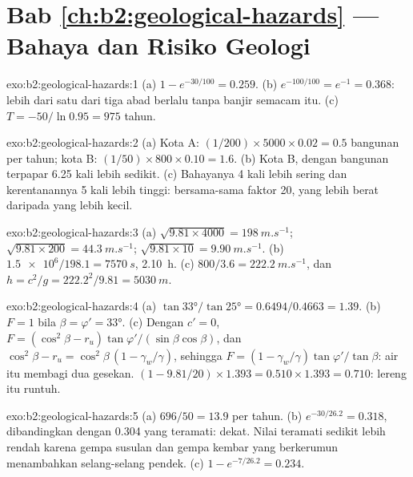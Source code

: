 \section*{Bab \ref{ch:b2:geological-hazards} --- Bahaya dan Risiko Geologi}

\begin{solution}{exo:b2:geological-hazards:1}
(a) $1 - e^{-30/100} = 0.259$. (b) $e^{-100/100} = e^{-1} = 0.368$: lebih dari satu dari tiga abad
berlalu tanpa banjir semacam itu. (c) $T = -50/\ln 0.95 = 975$ tahun.
\end{solution}

\begin{solution}{exo:b2:geological-hazards:2}
(a) Kota A: $(1/200) \times 5000 \times 0.02 = 0.5$ bangunan per tahun; kota B: $(1/50) \times 800
\times 0.10 = 1.6$. (b) Kota B, dengan bangunan terpapar 6.25 kali lebih sedikit. (c) Bahayanya 4 kali
lebih sering dan kerentanannya 5 kali lebih tinggi: bersama-sama faktor 20, yang lebih berat daripada
 yang lebih kecil.
\end{solution}

\begin{solution}{exo:b2:geological-hazards:3}
(a) $\sqrt{9.81 \times 4000} = \qty{198}{m.s^{-1}}$; $\sqrt{9.81 \times 200} = \qty{44.3}{m.s^{-1}}$;
$\sqrt{9.81 \times 10} = \qty{9.90}{m.s^{-1}}$. (b) $\num{1.5e6}/198.1 = \qty{7570}{s}$, \qty{2.10}{h}.
(c) $800/3.6 = \qty{222.2}{m.s^{-1}}$, dan $h = c^2/g = 222.2^2/9.81 = \qty{5030}{m}$.
\end{solution}

\begin{solution}{exo:b2:geological-hazards:4}
(a) $\tan\ang{33}/\tan\ang{25} = 0.6494/0.4663 = 1.39$. (b) $F = 1$ bila $\beta = \varphi' =
\ang{33}$. (c) Dengan $c' = 0$, $F = (\cos^2\beta - r_u)\tan\varphi'/(\sin\beta\cos\beta)$, dan $\cos^2\beta
- r_u = \cos^2\beta\,(1 - \gamma_w/\gamma)$, sehingga $F = (1 - \gamma_w/\gamma)\tan\varphi'/\tan\beta$:
air itu membagi dua gesekan. $(1 - 9.81/20) \times 1.393 = 0.510 \times 1.393 = 0.710$: lereng itu
runtuh.
\end{solution}

\begin{solution}{exo:b2:geological-hazards:5}
(a) $696/50 = 13.9$ per tahun. (b) $e^{-30/26.2} = 0.318$, dibandingkan dengan 0.304 yang teramati: dekat. Nilai
teramati sedikit lebih rendah karena gempa susulan dan gempa kembar yang berkerumun menambahkan selang-selang
pendek. (c) $1 - e^{-7/26.2} = 0.234$.
\end{solution}

